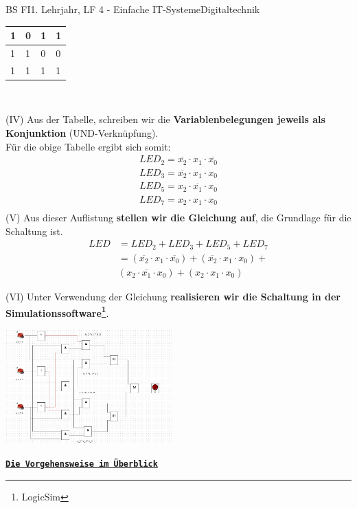 \documentclass[11pt,twocolumn,oneside,openany,headings=optiontotoc,11pt,numbers=noenddot]{article}
\begin{document}
\begin{worksheet}{BS FI}{1. Lehrjahr, LF 4 - Einfache IT-Systeme}{Digitaltechnik}
\begin{tabularx}{0.48\textwidth}{|M|M|M|M|}
			\hline
			 1 & 0 & 1 & 1\\
			 & 1 & 0 & 0\\
			\hline
			 1 & 1 & 1 & 1\\
			\hline
		\end{tabularx}\\
		\par
		(IV) Aus der Tabelle, schreiben wir die \textbf{Variablenbelegungen jeweils als Konjunktion} (UND-Verknüpfung).\\
		Für die obige Tabelle ergibt sich somit:
		\begin{align*}
			LED_2 = \overline{x_2} \cdot{} x_1 \cdot{} \overline{x_0}\\
			LED_3 = \overline{x_2} \cdot{} x_1 \cdot{} x_0\\
			LED_5 = x_2 \cdot{} \overline{x_1} \cdot{} x_0\\
			LED_7 = x_2 \cdot{} x_1 \cdot{} x_0\\
		\end{align*}
		\indent
		(V) Aus dieser Auflistung \textbf{stellen wir die Gleichung auf}, die Grundlage für die Schaltung ist.
		\begin{align*}
			LED & = LED_2 + LED_3 + LED_5 + LED_7\\
			& = (\overline{x_2} \cdot{} x_1 \cdot{} \overline{x_0}) + (\overline{x_2} \cdot{} x_1 \cdot{} x_0) +\\
			& (x_2 \cdot{} \overline{x_1} \cdot{} x_0) + (x_2 \cdot{} x_1 \cdot{} x_0)
		\end{align*}
		\par
		(VI) Unter Verwendung der Gleichung \textbf{realisieren wir die Schaltung in der Simulationssoftware\footnote{LogicSim}}.\\
		\par\noindent
		\includegraphics[width=0.48\textwidth]{../99_Bilder/prim.jpg}\\
		\par\noindent
		\texttt{\underline{\textbf{Die Vorgehensweise im Überblick}}}
		\begin{itemize}

\end{itemize}
\end{worksheet}
\end{document}

